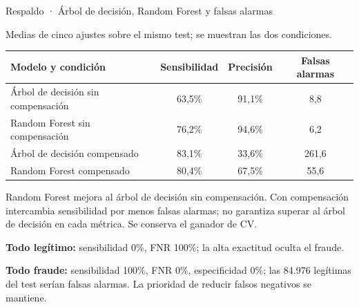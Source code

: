 \documentclass[aspectratio=169,10pt]{beamer}
\begin{document}
\begin{frame}{Respaldo · Árbol de decisión, Random Forest y falsas alarmas}
  \raggedright
  {\small Medias de cinco ajustes sobre el mismo test; se muestran las dos condiciones.}\par
  \vspace{0.18cm}
  {\small
  \begin{tabularx}{\textwidth}{X c c c}
    \toprule
    \rowcolor{FraudPaleBlue}\textbf{Modelo y condición} & \textbf{Sensibilidad} & \textbf{Precisión} & \textbf{Falsas alarmas} \\
    \midrule
    Árbol de decisión sin compensación & 63,5\% & 91,1\% & 8,8 \\
    Random Forest sin compensación & 76,2\% & 94,6\% & 6,2 \\
    \rowcolor{FraudLightGray}Árbol de decisión compensado & 83,1\% & 33,6\% & 261,6 \\
    \rowcolor{FraudLightGray}Random Forest compensado & 80,4\% & 67,5\% & 55,6 \\
    \bottomrule
  \end{tabularx}}
  \vspace{0.2cm}
  {\small Random Forest mejora al árbol de decisión sin compensación. Con compensación intercambia sensibilidad por menos falsas alarmas; no garantiza superar al árbol de decisión en cada métrica. Se conserva el ganador de CV.}\par
  \vspace{0.18cm}
  {\small\textbf{Todo legítimo:} sensibilidad 0\%, FNR 100\%; la alta exactitud oculta el fraude.}\par
  \vspace{0.12cm}
  {\small\textbf{Todo fraude:} sensibilidad 100\%, FNR 0\%, especificidad 0\%; las 84.976 legítimas del test serían falsas alarmas. La prioridad de reducir falsos negativos se mantiene.}\par
\end{frame}
\end{document}
